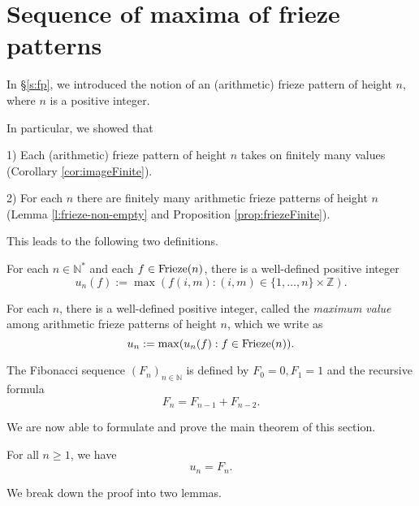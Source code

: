 \chapter{Sequence of maxima of frieze patterns}
In \S \ref{s:fp}, we introduced the notion of an (arithmetic) frieze pattern of height $n$, where $n$ is a positive integer.

In particular, we showed that 

1) Each (arithmetic) frieze pattern of height $n$ takes on finitely many values (Corollary \ref{cor:imageFinite}). 

2) For each $n$ there are finitely many arithmetic frieze patterns of height $n$ (Lemma \ref{l:frieze-non-empty} and 
Proposition \ref{prop:friezeFinite}).

This leads to the following two definitions.
\begin{definition}
    \label{def:unf}
For each $n \in \mathbb{N}^*$ and each $f \in {\rm Frieze}(n)$, there is a well-defined positive integer
\[
    u_n(f) := \max ( f (i,m) : (i,m)  \in \{1,\ldots,n \}\times \mathbb{Z}).
\]
\end{definition}

\begin{definition}
    \label{def:un}
    For each $n$, there is a well-defined
    positive integer, called the {\it maximum value} among arithmetic frieze patterns of height $n$, which we write as
    \[
        u_n := \max (u_n(f) : f \in  {\rm Frieze}(n)).
    \]
\end{definition}

\begin{definition}
    \label{def:fib}
    The Fibonacci sequence $(F_n)_{n \in \mathbb{N}}$ is defined by $F_0 = 0, F_1 = 1$ and the recursive formula
    \[
        F_n = F_{n-1} + F_{n-2}.
    \]
\end{definition}


We are now able to formulate and prove the main theorem of this section.
\begin{theorem}
    \label{MainTheorem}
    For all $n \geq 1$, we have 
    \[
        u_n = F_{n}.
    \]    
\end{theorem}
We break down the proof into two lemmas. 

